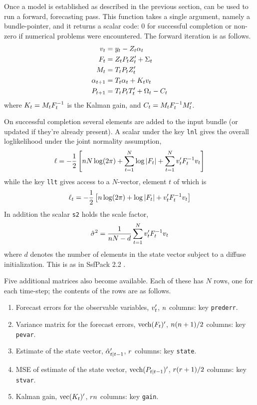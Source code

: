 Once a model is established as described in the previous section,
 can be used to run a forward, forecasting pass.  This
function takes a single argument, namely a bundle-pointer, and it
returns a scalar code: 0 for successful completion or non-zero if
numerical problems were encountered. The forward iteration is as
follows.
%
\begin{align*}
  v_t &= y_t - Z_t \alpha_t \\
  F_t &= Z_t P_t Z_t' + \Sigma_t \\
  M_t &= T_t P_t Z_t'\\
  \alpha_{t+1} &= T_t \alpha_t + K_t v_t \\
  P_{t+1} &= T_t P_t T_t' + \Omega_t - C_t\\
\end{align*}
%
where $K_t = M_tF^{-1}_t$ is the Kalman gain, and
$C_t = M_tF^{-1}_tM'_t$.

On successful completion several elements are added to the input
bundle (or updated if they're already present).  A scalar under the
key \texttt{lnl} gives the overall loglikelihood under the joint
normality assumption,
%
\[
  \ell = -\frac{1}{2} \left[n N \log(2 \pi) + \sum_{t=1}^N\log \left|F_t\right| +
    \sum_{t=1}^Nv_t'F_t^{-1} v_t
  \right]
\]
%
while the key \texttt{llt} gives access to a $N$-vector, element $t$ of
which is
%
\[
  \ell_t = -\frac{1}{2} \left[n \log(2 \pi) + \log \left|F_t\right| +
    v_t'F_t^{-1} v_t
  \right]
\]
In addition the scalar \texttt{s2} holds the scale factor,
%
\[
\hat{\sigma}^2 = \frac{1}{n N-d}
   \sum_{t=1}^Nv_t'F_t^{-1} v_t
 \]
where $d$ denotes the number of elements in the state vector subject
to a diffuse initialization. This is as in \textsf{SsfPack 2.2}
\citep{koopman-etal99}.

Five additional matrices also become available.  Each of these has $N$
rows, one for each time-step; the contents of the rows are as follows.
%
\begin{enumerate}
\item Forecast errors for the observable variables, $v_t'$,
  $n$ columns: key \texttt{prederr}.
\item Variance matrix for the forecast errors, $\mbox{vech}(F_t)'$,
  $n(n + 1)/2$ columns: key \texttt{pevar}.
\item Estimate of the state vector, $\hat{\alpha}_{t|t-1}'$,
  $r$ columns: key \texttt{state}.
\item MSE of estimate of the state vector,
  $\mbox{vech}(P_{t|t-1})'$, $r(r + 1)/2$ columns: key
  \texttt{stvar}.
\item Kalman gain, $\mbox{vec}(K_t)'$, $r n$ columns: key
  \texttt{gain}.
\end{enumerate}

